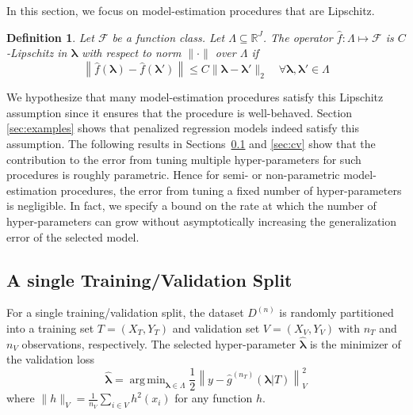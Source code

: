 \documentclass[12pt]{article}
\newtheorem{definition}{Definition}
\DeclareMathOperator*{\argmin}{arg\,min}
\begin{document}
In this section, we focus on model-estimation procedures that are Lipschitz.
\begin{definition}
	\label{def:smooth_funcs}
	Let $\mathcal{F}$ be a function class. Let $\Lambda \subseteq \mathbb{R}^J$.
	The operator $\hat{f}: \Lambda \mapsto \mathcal{F}$ is $C$-Lipschitz in $\boldsymbol{\lambda}$ with respect to norm $\| \cdot \|$ over $\Lambda$ if
	\begin{equation}
	\left \| \hat{f}(\boldsymbol \lambda) - \hat{f}(\boldsymbol \lambda ') \right \|
	\le
	C \| \boldsymbol \lambda - \boldsymbol \lambda' \|_2 
	\quad
	\forall \boldsymbol \lambda,\boldsymbol \lambda' \in \Lambda
	\label{eq:smooth_funcs}
	\end{equation}
\end{definition}
We hypothesize that many model-estimation procedures satisfy this Lipschitz assumption since it ensures that the procedure is well-behaved. Section \ref{sec:examples} shows that penalized regression models indeed satisfy this assumption. The following results in Sections~\ref{sec:single} and \ref{sec:cv} show that the contribution to the error from tuning multiple hyper-parameters for such procedures is roughly parametric. Hence for semi- or non-parametric model-estimation procedures, the error from tuning a fixed number of hyper-parameters is negligible. In fact, we specify a bound on the rate at which the number of hyper-parameters can grow without asymptotically increasing the generalization error of the selected model.

\subsection{A single Training/Validation Split}\label{sec:single}

For a single training/validation split, the dataset $D^{(n)}$ is randomly partitioned into a training set $T = (X_T, Y_T)$ and validation set $V = (X_V, Y_V)$ with $n_T$ and $n_V$ observations, respectively. The selected hyper-parameter $\hat{\boldsymbol{\lambda}}$ is the minimizer of the validation loss
\begin{equation}
\label{eq:train_val_lambda}
\hat{\boldsymbol \lambda} = \argmin_{\boldsymbol{\lambda} \in\Lambda} \frac{1}{2} \left \| y-\hat{g}^{(n_T)}( \boldsymbol \lambda | T) \right \|_{V}^{2}
\end{equation}
where $\| h \|_{V}=\frac{1}{n_V}\sum_{i\in V} h^2(x_i)$ for any function $h$. 
\end{document}
